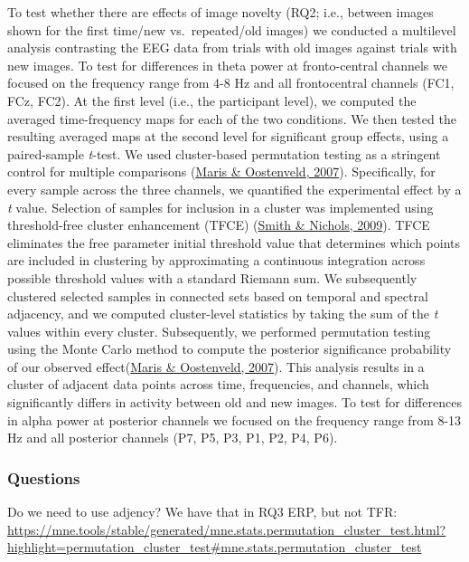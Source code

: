 \documentclass[
  man,floatsintext]{apa6}
\begin{document}
To test whether there are effects of image novelty (RQ2; i.e., between images shown for the first time/new vs.~repeated/old images) we conducted a multilevel analysis contrasting the EEG data from trials with old images against trials with new images. To test for differences in theta power at fronto-central channels we focused on the frequency range from 4-8 Hz and all frontocentral channels (FC1, FCz, FC2). At the first level (i.e., the participant level), we computed the averaged time-frequency maps for each of the two conditions. We then tested the resulting averaged maps at the second level for significant group effects, using a paired-sample \emph{t}-test. We used cluster-based permutation testing as a stringent control for multiple comparisons (\protect\hyperlink{ref-maris2007}{Maris \& Oostenveld, 2007}). Specifically, for every sample across the three channels, we quantified the experimental effect by a \emph{t} value. Selection of samples for inclusion in a cluster was implemented using threshold-free cluster enhancement (TFCE) (\protect\hyperlink{ref-smith2009}{Smith \& Nichols, 2009}). TFCE eliminates the free parameter initial threshold value that determines which points are included in clustering by approximating a continuous integration across possible threshold values with a standard Riemann sum. We subsequently clustered selected samples in connected sets based on temporal and spectral adjacency, and we computed cluster-level statistics by taking the sum of the \emph{t} values within every cluster. Subsequently, we performed permutation testing using the Monte Carlo method to compute the posterior significance probability of our observed effect(\protect\hyperlink{ref-maris2007}{Maris \& Oostenveld, 2007}). This analysis results in a cluster of adjacent data points across time, frequencies, and channels, which significantly differs in activity between old and new images. To test for differences in alpha power at posterior channels we focused on the frequency range from 8-13 Hz and all posterior channels (P7, P5, P3, P1, P2, P4, P6).

\hypertarget{questions}{%
\subsubsection{Questions}\label{questions}}

Do we need to use adjency? We have that in RQ3 ERP, but not TFR: \url{https://mne.tools/stable/generated/mne.stats.permutation_cluster_test.html?highlight=permutation_cluster_test\#mne.stats.permutation_cluster_test}
\end{document}
